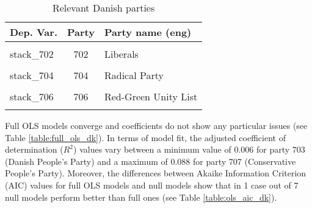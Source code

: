 \documentclass[
]{article}
\begin{document}
\begin{table}[!h]

\caption{\label{tab:unnamed-chunk-46}Relevant Danish parties \label{table:relprty_tab_dk}}
\centering
\begin{tabular}[t]{lcl}
\toprule
Dep. Var. & Party & Party name (eng)\\
\midrule
\cellcolor{gray!6}{stack\_701} & \cellcolor{gray!6}{701} & \cellcolor{gray!6}{Social Democratic Party}\\
stack\_702 & 702 & Liberals\\
\cellcolor{gray!6}{stack\_703} & \cellcolor{gray!6}{703} & \cellcolor{gray!6}{Danish People's Party}\\
stack\_704 & 704 & Radical Party\\
\cellcolor{gray!6}{stack\_705} & \cellcolor{gray!6}{705} & \cellcolor{gray!6}{Socialist People's Party}\\
\addlinespace
stack\_706 & 706 & Red-Green Unity List\\
\cellcolor{gray!6}{stack\_707} & \cellcolor{gray!6}{707} & \cellcolor{gray!6}{Conservative People's Party}\\
\bottomrule
\end{tabular}
\end{table}

Full OLS models converge and coefficients do not show any particular issues (see Table
\ref{table:full_ols_dk}).
In terms of model fit, the adjusted coefficient of determination (\(R^2\)) values vary between
a minimum value of 0.006
for party 703
(Danish People's Party)
and a maximum of 0.088
for party 707
(Conservative People's Party).
Moreover, the differences between Akaike Information Criterion (AIC) values for full OLS models and null
models show that in 1 case out of 7 null models perform better than full ones (see Table
\ref{table:ols_aic_dk}).
\end{document}
